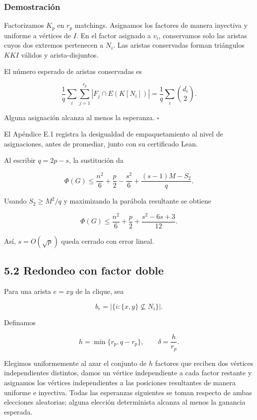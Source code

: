 \documentclass[
  spanish,
  11pt,
  a4paper,
]{article}
\begin{document}
\subsubsection{Demostración}\label{demostraciuxf3n-3}

Factorizamos \(K_p\) en \(r_p\) matchings. Asignamos los factores de manera inyectiva y uniforme a vértices de \(I\). En el factor asignado a \(v_i\), conservamos solo las aristas cuyos dos extremos pertenecen a \(N_i\). Las aristas conservadas forman triángulos \(KKI\) válidos y arista-disjuntos.

El número esperado de aristas conservadas es

\[
\frac1q\sum_i\sum_{j=1}^{r_p}|F_j\cap E(K[N_i])|
=
\frac1q\sum_i\binom{d_i}{2}.
\]

Alguna asignación alcanza al menos la esperanza. \(\square\)

El Apéndice E.1 registra la desigualdad de empaquetamiento al nivel de asignaciones, antes de promediar, junto con su certificado Lean.

Al escribir \(q=2p-s\), la sustitución da

\[
\Phi(G)
\le
\frac{n^2}{6}+\frac p2-\frac{s^2}{6}
+
\frac{(s-1)M-S_2}{q}.
\tag{5.2}
\]

Usando \(S_2\ge M^2/q\) y maximizando la parábola resultante se obtiene

\[
\boxed{
\Phi(G)
\le
\frac{n^2}{6}+\frac p2+\frac{s^2-6s+3}{12}.
}
\tag{5.3}
\]

Así, \(s=O(\sqrt p)\) queda cerrado con error lineal.

\subsection{5.2 Redondeo con factor doble}\label{redondeo-con-factor-doble}

Para una arista \(e=xy\) de la clique, sea

\[
b_e=|\{i:\{x,y\}\not\subseteq N_i\}|.
\]

Definamos

\[
h=\min\{r_p,q-r_p\},
\qquad
\delta=\frac h{r_p}.
\]

Elegimos uniformemente al azar el conjunto de \(h\) factores que reciben dos vértices independientes distintos, damos un vértice independiente a cada factor restante y asignamos los vértices independientes a las posiciones resultantes de manera uniforme e inyectiva. Todas las esperanzas siguientes se toman respecto de ambas elecciones aleatorias; alguna elección determinista alcanza al menos la ganancia esperada.
\end{document}
